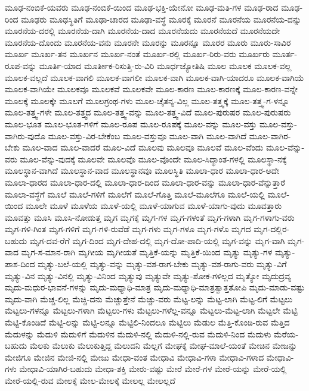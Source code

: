 {ಮೂಢ-ನಂಬಿಕೆ-ಯವರು
ಮೂಢ-ನಂಬಿಕೆ-ಯಿಂದ
ಮೂಢ-ಭಕ್ತಿ-ಯೇನೋ
ಮೂಢ-ಮತಿ-ಗಳ
ಮೂಢ-ರಾದ
ಮೂಢ-ರಿಂದ
ಮೂಢರು
ಮೂಢಸ್ಥಿತಿಗೆ
ಮೂಢಾ-ಚಾರದ
ಮೂಢಾ-ವಸ್ಥೆ
ಮೂರಕ್ಕೆ
ಮೂರನೆ
ಮೂರನೆಯ
ಮೂರನೆಯ-ದನ್ನು
ಮೂರನೆಯ-ದರಲ್ಲಿ
ಮೂರನೆಯ-ದಾಗಿ
ಮೂರನೆಯ-ದಾದ
ಮೂರನೆಯದು
ಮೂರನೆಯದೆ
ಮೂರನೆಯದೇ
ಮೂರನೆಯ-ದೊಂದು
ಮೂರನೆಯ-ವನು
ಮೂರನೇ
ಮೂರನ್ನು
ಮೂರನ್ನೂ
ಮೂರರ
ಮೂರು
ಮೂರು-ಸಾವಿರ
ಮೂರ್ಖ
ಮೂರ್ಖ-ತನ
ಮೂರ್ಖನ
ಮೂರ್ಖ-ನಂತೆ
ಮೂರ್ಖ-ರಲ್ಲಿ
ಮೂರ್ಖ-ರಿರು-ವರು
ಮೂರ್ಖರು
ಮೂರ್ತ-ರೂಪ-ವನ್ನು
ಮೂರ್ತಿ-ಯಾದ
ಮೂರ್ತೀಕ-ರಿಸುತ್ತಿ-ರು-ವಿರಿ
ಮೂರ್ಧಜ್ಯೋತಿಷಿ
ಮೂಲ
ಮೂಲಕ
ಮೂಲಕ-ವಲ್ಲ
ಮೂಲಕ-ವಲ್ಲದೆ
ಮೂಲಕ-ವಾಗಲಿ
ಮೂಲಕ-ವಾಗಲೀ
ಮೂಲಕ-ವಾಗಿ
ಮೂಲಕ-ವಾಗಿ-ಯಾದರೂ
ಮೂಲಕ-ವಾಗಿಯೆ
ಮೂಲಕ-ವಾಗಿಯೇ
ಮೂಲಕವೂ
ಮೂಲಕವೆ
ಮೂಲಕವೇ
ಮೂಲ-ಕಾರಣ
ಮೂಲ-ಕಾರಣಕ್ಕೆ
ಮೂಲ-ಕಾರಣ-ವನ್ನೇ
ಮೂಲಕ್ಕೆ
ಮೂಲಕ್ಕೇ
ಮೂಲಗೆ
ಮೂಲಗ್ರಂಥ-ಗಳು
ಮೂಲ-ಚೈತನ್ಯ-ವಿಲ್ಲ
ಮೂಲ-ತತ್ತ್ವಕ್ಕೆ
ಮೂಲ-ತತ್ತ್ವ-ಗ-ಳನ್ನೂ
ಮೂಲ-ತತ್ತ್ವ-ಗಳೇ
ಮೂಲ-ತತ್ತ್ವದ
ಮೂಲ-ತತ್ತ್ವ-ವನ್ನು
ಮೂಲ-ತತ್ತ್ವ-ವಿದೆ
ಮೂಲ-ಪುರುಷರ
ಮೂಲ-ಪುರುಷರು
ಮೂಲ-ಭೂತ
ಮೂಲ-ಭೂತ-ಗಳಿಗೆ
ಮೂಲ-ರೂಪ
ಮೂಲ-ರೂಪಕ್ಕೆ
ಮೂಲ-ವನ್ನು
ಮೂಲ-ವಸ್ತು
ಮೂಲ-ವಸ್ತು-ವಾಗಿರು-ವುದೊ
ಮೂಲ-ವಸ್ತು-ವಿರ-ಬೇಕೆಂಬ
ಮೂಲ-ವಸ್ತುವೂ
ಮೂಲ-ವಾಗಿ
ಮೂಲ-ವಾಗಿದೆ
ಮೂಲ-ವಾಗಿರ-ಬೇಕು
ಮೂಲ-ವಾದ
ಮೂಲ-ವಾದರೆ
ಮೂಲ-ವಿದೆ
ಮೂಲವು
ಮೂಲವೂ
ಮೂಲವೆ
ಮೂಲ-ವೆಂದು
ಮೂಲ-ವೆನ್ನು-ವರು
ಮೂಲ-ವೆನ್ನು-ವುದಕ್ಕೆ
ಮೂಲವೇ
ಮೂಲವೊ
ಮೂಲ-ವೊಂದೇ
ಮೂಲ-ಸಿದ್ಧಾಂತ-ಗಳಲ್ಲಿ
ಮೂಲಸ್ಥಾ-ನಕ್ಕೆ
ಮೂಲಸ್ಥಾನ-ವಾಗಿದೆ
ಮೂಲಸ್ಥಾನ-ವಾದ
ಮೂಲಸ್ಥಾನವೂ
ಮೂಲಸ್ಥಿತಿ
ಮೂಲಾ-ಧಾರ
ಮೂಲಾ-ಧಾರ-ಅದೇ
ಮೂಲಾ-ಧಾರದ
ಮೂಲಾ-ಧಾರ-ದಲ್ಲಿ
ಮೂಲಾ-ಧಾರ-ದಿಂದ
ಮೂಲಾ-ಧಾರ-ವನ್ನು
ಮೂಲಾ-ಧಾರ-ವೆನ್ನುತ್ತಾರೆ
ಮೂಲಾ-ವಸ್ಥೆಗೆ
ಮೂಲೆ
ಮೂಲೆ-ಗಳಿಗೆ
ಮೂಲೆಗೆ
ಮೂಲೆ-ಗೊತ್ತಿ
ಮೂಲೆ-ಮೂಲೆಗೂ
ಮೂಲೆ-ಯಲ್ಲಿ
ಮೂಲೆ-ಯಿಂದ
ಮೂಲೇ
ಮೂಳೆ
ಮೂಳೆಯ
ಮೂಳೆ-ಯಲ್ಲಿ
ಮೂಳೆ-ಯಾಗುವ
ಮೂಳೆ-ಯಾಗು-ವುದು
ಮೂವತ್ತಾರು
ಮೂವತ್ತು
ಮೂಸಿ
ಮೂಸಿ-ನೋಡುತ್ತ
ಮೃಗ
ಮೃಗಕ್ಕೆ
ಮೃಗ-ಗಳ
ಮೃಗ-ಗಳಂತೆ
ಮೃಗ-ಗಳಾಗಿ
ಮೃಗ-ಗಳಾಗು-ವರು
ಮೃಗ-ಗಳಿ-ಗಿಂತ
ಮೃಗ-ಗಳಿಗೆ
ಮೃಗ-ಗಳಿ-ರುವೆಡೆ
ಮೃಗ-ಗಳು
ಮೃಗ-ಗಳೂ
ಮೃಗ-ಗಳೊ
ಮೃಗದ
ಮೃಗ-ದಲ್ಲಿರ-ಬಹುದು
ಮೃಗ-ದವ-ರೆಗೆ
ಮೃಗ-ದಿಂದ
ಮೃಗ-ದೇಹ-ದಲ್ಲಿ
ಮೃಗ-ದೋ-ಪಾದಿ-ಯಲ್ಲಿ
ಮೃಗ-ವನ್ನು
ಮೃಗ-ವಾಗಿ
ಮೃಗ-ವಾದ
ಮೃಗ-ಸ-ಮಾನ-ರಾಗಿ
ಮೃಗೀಯ
ಮೃಗೀಯತೆ
ಮೃತ್ತಿಕೆ-ಯನ್ನು
ಮೃತ್ತಿಕೆ-ಯಿಂದ
ಮೃತ್ಯು
ಮೃತ್ಯು-ಗಳ
ಮೃತ್ಯು-ಪಾಶ-ದಿಂದ
ಮೃತ್ಯು-ಬಲೆ-ಯಲ್ಲಿ
ಮೃತ್ಯು-ವನ್ನು
ಮೃತ್ಯು-ವಶ-ರಾಗ-ಬೇಕು
ಮೃತ್ಯು-ವಶ-ರಾಗು-ವರು
ಮೃತ್ಯು-ವಿಗೆ
ಮೃತ್ಯು-ವಿನ
ಮೃತ್ಯು-ವಿನಲ್ಲಿ
ಮೃತ್ಯು-ವಿನಿಂದ
ಮೃತ್ಯುವು
ಮೃತ್ಯುವೇ
ಮೃತ್ಯು-ಶೋಕ-ಗಳಿಲ್ಲದ
ಮೃತ್ಯೋ
ಮೃದುದ್ರವ್ಯ
ಮೃದು-ಮಧುರ-ಭಾವನೆ-ಗಳನ್ನು
ಮೃದು-ಮಧ್ಯಾಧಿ-ಮಾತ್ರ
ಮೃದು-ಮಧ್ಯಾಧಿ-ಮಾತ್ರತ್ವಾತ್ತತೋಪಿ
ಮೃದು-ಮಾಡು-ವಷ್ಟು
ಮೃದು-ವಾಗಿ
ಮೆಚ್ಚ-ಲಿಲ್ಲ
ಮೆಚ್ಚಿ-ದನು
ಮೆಚ್ಚುತ್ತೇನೆ
ಮೆಚ್ಚು-ವರು
ಮೆಟ್ಟ-ಲನ್ನು
ಮೆಟ್ಟ-ಲಾಗಿ
ಮೆಟ್ಟ-ಲಿಗೆ
ಮೆಟ್ಟಲು
ಮೆಟ್ಟಲು-ಗಳನ್ನೂ
ಮೆಟ್ಟಲು-ಗಳಾಗಿ
ಮೆಟ್ಟಲು-ಗಳು
ಮೆಟ್ಟಲು-ಗಳೆಲ್ಲ-ವನ್ನೂ
ಮೆಟ್ಟಲು-ಮೆಟ್ಟ-ಲಾಗಿ
ಮೆಟ್ಟಲೇ
ಮೆಟ್ಟಿ
ಮೆಟ್ಟಿ-ಕೊಂಡಿದೆ
ಮೆಟ್ಟಿ-ಲನ್ನು
ಮೆಟ್ಟಿ-ಲನ್ನೂ
ಮೆಟ್ಟಿಲಿ-ನಿಂದಲೂ
ಮೆಟ್ಟಿಲು
ಮೆಡುಲ
ಮೆತ್ತಿ-ಕೊಂಡಿ-ರುವ
ಮೆತ್ತಿದ
ಮೆದುಳನ್ನು
ಮೆದುಳಿ
ಮೆದುಳಿಗೆ
ಮೆದುಳಿನ
ಮೆದುಳಿ-ನಲ್ಲಿ
ಮೆದುಳಿ-ನಲ್ಲಿ-ರುವ
ಮೆದುಳಿ-ನಿಂದ
ಮೆದುಳು
ಮೆರೆಯ-ಬಹುದು
ಮೆಲಕು
ಮೆಲುಕು
ಮೆಲುಕುತ್ತಿದ್ದ
ಮೆಲುದನಿ
ಮೆಲ್ಲಗೆ
ಮೇಘಕ್ಕೆ
ಮೇಘ-ಮಾಲೆ-ಯಂತೆ
ಮೇಚಿನ
ಮೇಜನ್ನು
ಮೇಜಿಗೂ
ಮೇಜಿನ
ಮೇಜಿ-ನಲ್ಲಿ
ಮೇಜು
ಮೇಧಾ-ವಂತ
ಮೇಧಾವಿ
ಮೇಧಾವಿ-ಗಳಾ
ಮೇಧಾವಿ-ಗಳಾದ
ಮೇಧಾವಿ-ಗಳು
ಮೇಧಾವಿ-ಯಾಗಿರ-ಬಹುದು
ಮೇಧಾ-ಶಕ್ತಿ
ಮೇರು-ವಷ್ಟು
ಮೇರೆ
ಮೇರೆ-ಗಳ
ಮೇರೆ-ಯನ್ನು
ಮೇರೆ-ಯಲ್ಲಿ
ಮೇರೆ-ಯಲ್ಲಿ-ರುವ
ಮೇಲಕ್ಕೆ
ಮೇಲ-ಮೇಲಕ್ಕೆ
ಮೇಲಲ್ಲ
ಮೇಲಲ್ಲದೆ
}
